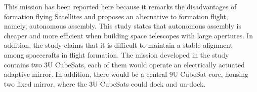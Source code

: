 This mission has been reported here because it remarks the disadvantages
of formation flying Satellites and proposes an alternative to formation
flight, namely, autonomous assembly. This study states that autonomous assembly
is cheaper and more efficient when building space telescopes with
large apertures. In addition, the study claims that it is difficult
to maintain a stable alignment among spacecrafts in flight formation.
The mission developed in the study contains two 3U CubeSats, each
of them would operate an electrically actuated adaptive mirror. In
addition, there would be a central 9U CubeSat core, housing two fixed
mirror, where the 3U CubeSats could dock and un-dock.\cite{Underwood_ReconfigTelescope}